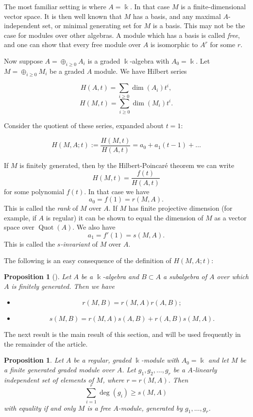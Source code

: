 \documentclass[a4paper]{amsart}
\newcommand{\kk}{\Bbbk}
\def\Quot{\operatorname{Quot}}
\newtheorem{prop}[Lemma]{Proposition}
\newtheorem*{Corollary of Conjecture}{Corollary of Conjecture}
\theoremstyle{definition}
\theoremstyle{remark}
\theoremstyle{Acknowledgments}
\begin{document}
The most familiar setting is where $A = \kk$. In that case $M$ is a finite-dimensional vector space. It is then well known that $M$ has a basis, and any maximal $A$-independent set, or minimal generating set for $M$ is a basis. This may not be the case for modules over other algebras. A module which has a basis is called \emph{free}, and one can show that every free module over $A$ is isomorphic to $A^r$ for some $r$.

Now suppose $A = \oplus_{i \geq 0} A_i$ is a graded $\kk$-algebra with $A_0 = \kk$. Let $M = \oplus_{i \geq 0} M_i$ be a graded $A$ module. We have Hilbert series

\[H(A,t) = \sum_{i \geq 0} \dim(A_i)t^i,\]
\[H(M,t) = \sum_{i \geq 0} \dim(M_i)t^i.\]

Consider the quotient of these series, expanded about $t = 1$:

\[H(M, A; t):= \frac{H(M,t)}{H(A,t)} = a_0 + a_1(t-1) + \ldots  \]

If $M$ is finitely generated, then by the Hilbert-Poincar\'e theorem we can write $$H(M,t) = \frac{f(t)}{H(A,t)}$$ for some polynomial $f(t)$. 
In that case we have 
\[a_0 = f(1) = r(M,A).\]
This is called the \emph{rank} of $M$ over $A$. If $M$ has finite projective dimension (for example, if $A$ is regular) it can be shown to equal the dimension of $M$ as a vector space over $\Quot(A)$. We also have
\[a_1= f'(1) = s(M,A). \] This is called the \emph{$s$-invariant} of $M$ over $A$.

The following is an easy consequence of the definition of $H(M, A;t)$:

\begin{prop}[\cite{BroerChuaiRelative}]\label{ssubalg} Let $A$ be a $\kk$-algebra and $B \subset A$ a subalgebra of $A$ over which $A$ is finitely generated. Then we have
\begin{itemize}
\item[(a)] \[r(M,B) = r(M,A)r(A,B);\]
\item[(b)] \[s(M,B) = r(M,A)s(A,B) + r(A,B)s(M,A).\]
\end{itemize}
\end{prop}

The next result is the main result of this section, and will be used frequently in the remainder of the article.

\iffalse %
\begin{prop} Let $A$ be a regular, graded $\kk$-module with $A_0= \kk$ and let $M$ be a finite generated graded module over $A$. Let $g_1, g_2, \ldots, g_r$ be a $A$-linearly independent set of elements of $M$, where $r = r(M,A)$. Then
\[\sum_{i=1}^r \deg(g_i) \geq s(M,A)\] with equality if and only $M$ is a free $A$-module, generated by $g_1, \ldots, g_r$.
\end{prop}
\end{document}
